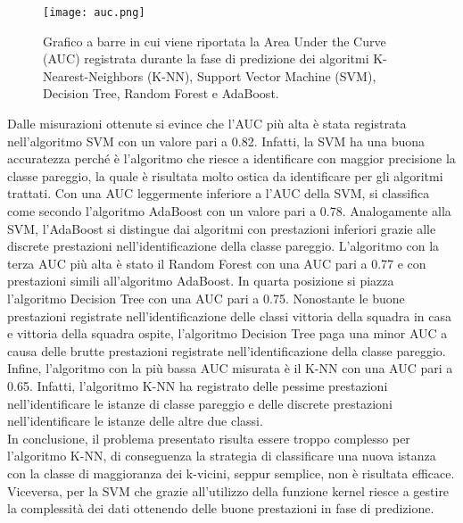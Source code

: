 \begin{figure}[h]
	\begin{center}
		\texttt{[image: auc.png]}
		\caption{Grafico a barre in cui viene riportata la Area Under the Curve (AUC) registrata durante la fase di predizione dei algoritmi K-Nearest-Neighbors (K-NN),  Support Vector Machine (SVM), Decision Tree, Random Forest e AdaBoost.  
		} 
		\label{fig:auc}
	\end{center}
\end{figure}
Dalle misurazioni ottenute si evince che l'AUC più alta è stata registrata nell'algoritmo SVM con un valore pari a 0.82. Infatti, la SVM ha una buona accuratezza perché è l'algoritmo che riesce a identificare con maggior precisione la classe pareggio, la quale è risultata molto ostica da identificare per gli algoritmi trattati. Con una AUC leggermente inferiore a l'AUC della SVM, si classifica come secondo l'algoritmo AdaBoost con un valore pari a 0.78. Analogamente alla SVM, l'AdaBoost si distingue dai algoritmi con prestazioni inferiori grazie alle discrete prestazioni nell'identificazione della classe pareggio. L'algoritmo con la terza AUC più alta è stato il Random Forest con una AUC pari a 0.77 e con prestazioni simili all'algoritmo AdaBoost.
In quarta posizione si piazza l'algoritmo Decision Tree con una AUC pari a 0.75. Nonostante le buone prestazioni registrate nell'identificazione delle classi vittoria della squadra in casa e vittoria della squadra ospite, l'algoritmo Decision Tree paga una minor AUC a causa delle brutte prestazioni registrate nell'identificazione della classe pareggio. Infine, l'algoritmo con la più bassa AUC misurata è il K-NN con una AUC pari a 0.65. Infatti, l'algoritmo K-NN ha registrato delle pessime prestazioni nell'identificare le istanze di classe pareggio e delle discrete prestazioni nell'identificare le istanze delle altre due classi.\\
In conclusione, il problema presentato risulta essere troppo complesso per l'algoritmo K-NN, di conseguenza la strategia di classificare una nuova istanza con la classe di maggioranza dei k-vicini, seppur semplice, non è risultata efficace. Viceversa, per la SVM che grazie all'utilizzo della funzione kernel riesce a gestire la complessità dei dati ottenendo delle buone prestazioni in fase di predizione.
